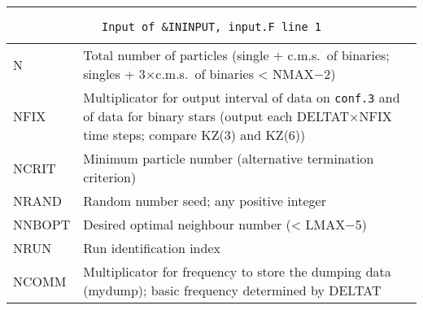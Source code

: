 \hrule
\noindent
\begin{longtable}{@{}p{1.5cm}p{13.0cm}}
\caption{\texttt{Input of \&ININPUT, input.F line 1}}
\label{table:ininput1}\\\hline
%
N       & Total number of particles (single + c.m.s.~of binaries;
          singles + 3$\times$c.m.s.~of binaries < NMAX$-$2)\\
NFIX    & Multiplicator for output interval of data on \texttt{conf.3} and
          of data for binary stars (output each DELTAT$\times$NFIX time steps; compare KZ(3) and KZ(6))\\
NCRIT   & Minimum particle number (alternative termination criterion) \\
NRAND   & Random number seed; any positive integer \\
NNBOPT  & Desired optimal neighbour number (< LMAX$-$5)\\ %
NRUN    & Run identification index\\
NCOMM   & Multiplicator for frequency to store the dumping data (mydump); basic frequency determined by DELTAT \\
\end{longtable}

